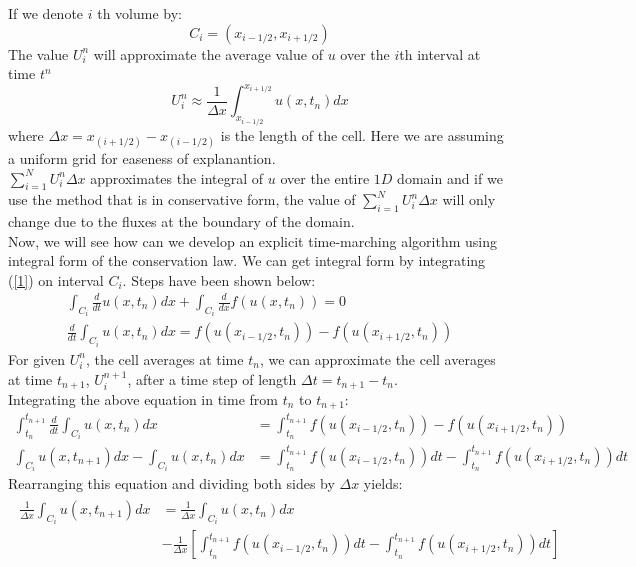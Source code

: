 If we denote $i$ th volume by:
\begin{equation}
C_i = (x_{i-1/2},x_{i+1/2})
\end{equation}
The value $U^n_i$ will approximate the average value of $u$ over the $i$th interval at time $t^n$
\begin{equation}
U_i^n \approx \frac{1}{\Delta x}\int_{x_{i-1/2}}^{x_{i+1/2}} u(x, t_n) dx
\end{equation}
where $\Delta x=x_(i+1/2)-x_(i-1/2 )$ is the length of the cell. Here we are assuming a uniform grid for easeness of explanantion.\\
$\sum_{i=1}^N U_i^n \Delta x$ approximates the integral of $u$ over the entire $1D$ domain and if we use the method that is in conservative form, the value of $\sum_{i=1}^N U^n_i \Delta x$ will only change due to the fluxes at the boundary of the domain.\\
Now, we will see how can we develop an explicit time-marching algorithm using integral form of the conservation law. We can get integral form by integrating (\ref{1}) on interval $C_i$. Steps have been shown below:
\begin{gather*}
\int_{C_i}\frac{d}{dt} u(x,t_n) dx +\int_{C_i} \frac{d}{dx} f(u(x,t_n)) = 0 \\
\frac{d}{dt}\int_{C_i}u(x, t_n)dx =  f(u(x_{i-1/2}, t_n)) - f(u(x_{i+1/2},t_n))
\end{gather*}
For given $U_i^n$, the cell averages at time $t_n$, we can approximate the cell averages at time $t_{n+1}$, $U_i^{n+1}$, after a time step of length $\Delta t = t_{n+1} - t_n$. \\
Integrating the above equation in time from $t_n$ to $t_{n+1}$:
\begin{align*}
\int_{t_n}^{t_{n+1}} \frac{d}{dt} \int_{C_i} u(x, t_n) dx &= \int_{t_n}^{t_{n+1}} f(u(x_{i-1/2}, t_n)) - f(u(x_{i+1/2}, t_n)) \\
\int_{C_i} u(x, t_{n+1})dx - \int_{C_i} u(x, t_n)dx &=  \int_{t_n}^{t_{n+1}} f(u(x_{i-1/2}, t_n)) dt - \int_{t_n}^{t_{n+1}} f(u(x_{i+1/2}, t_n)) dt
\end{align*}
Rearranging this equation and dividing both sides by $\Delta x$ yields:
\begin{align} \label{4}
\begin{split}
\frac{1}{\Delta x} \int_{C_i} u(x, t_{n+1}) dx &= \frac{1}{\Delta x} \int_{C_i} u(x, t_n) dx \\ &- \frac{1}{\Delta x} \left[ \int_{t_n}^{t_{n+1}} f(u(x_{i-1/2}, t_n)) dt -  \int_{t_n}^{t_{n+1}} f(u(x_{i+1/2}, t_n)) dt \right]
\end{split}
\end{align}

